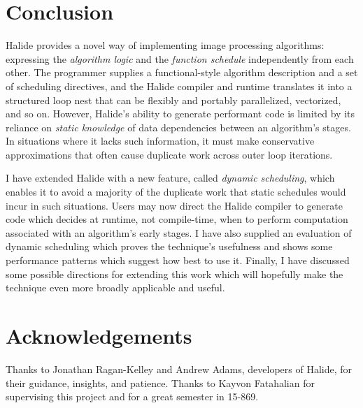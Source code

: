\documentclass{article}
\begin{document}



\section{Conclusion}

Halide provides a novel way of implementing image processing algorithms: expressing the {\em algorithm logic} and the {\em function schedule} independently from each other. The programmer supplies a functional-style algorithm description and a set of scheduling directives, and the Halide compiler and runtime translates it into a structured loop nest that can be flexibly and portably parallelized, vectorized, and so on.
However, Halide's ability to generate performant code is limited by its reliance on {\em static knowledge} of data dependencies between an algorithm's stages. In situations where it lacks such information, it must make conservative approximations that often cause duplicate work across outer loop iterations.

I have extended Halide with a new feature, called {\em dynamic scheduling}, which enables it to avoid a majority of the duplicate work that static schedules would incur in such situations. Users may now direct the Halide compiler to generate code which decides at runtime, not compile-time, when to perform computation associated with an algorithm's early stages. I have also supplied an evaluation of dynamic scheduling which proves the technique's usefulness and shows some performance patterns which suggest how best to use it. Finally, I have discussed some possible directions for extending this work which will hopefully make the technique even more broadly applicable and useful.

\section*{Acknowledgements}

Thanks to Jonathan Ragan-Kelley and Andrew Adams, developers of Halide, for their guidance, insights, and patience. Thanks to Kayvon Fatahalian for supervising this project and for a great semester in 15-869.

{}

\end{document}
